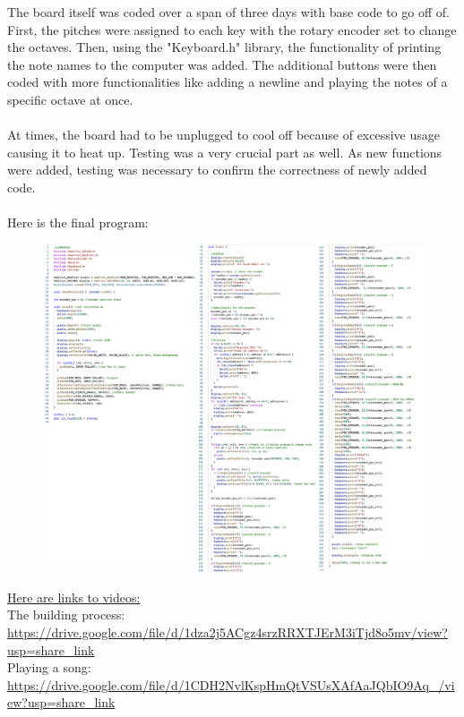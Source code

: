 \documentclass{article}
\begin{document}
The board itself was coded over a span of three days with base code to go off of. First, the pitches were assigned to each key with the rotary encoder set to change the octaves. Then, using the "Keyboard.h" library, the functionality of printing the note names to the computer was added. The additional buttons were then coded with more functionalities like adding a newline and playing the notes of a specific octave at once. \\\\

At times, the board had to be unplugged to cool off because of excessive usage causing it to heat up. Testing was a very crucial part as well. As new functions were added, testing was necessary to confirm the correctness of newly added code. \\\\

Here is the final program:\\

\begin{figure}[H]
    \centering
    \includegraphics[width=\textwidth]{images/CODE.png}
\end{figure}

\noindent
\underline{Here are links to videos:}\\
The building process: \url{https://drive.google.com/file/d/1dza2j5ACgz4srzRRXTJErM3iTjd8o5mv/view?usp=share_link} \\
Playing a song: \url{https://drive.google.com/file/d/1CDH2NvlKspHmQtVSUsXAfAaJQbIO9Aq_/view?usp=share_link}\\
\end{document}

